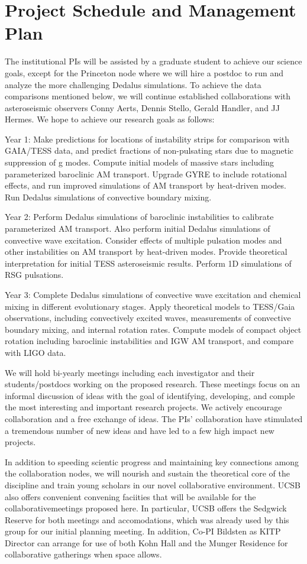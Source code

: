 \section{Project Schedule and Management Plan}

The institutional PIs will be assisted by a graduate student to achieve our science goals, except for the Princeton node where we will hire a postdoc to run and analyze the more challenging Dedalus simulations. To achieve the data comparisons mentioned below, we will continue established collaborations with asteroseismic observers Conny Aerts, Dennis Stello, Gerald Handler, and JJ Hermes. We hope to achieve our research goals as follows:

Year 1: Make predictions for locations of instability strips for comparison with GAIA/TESS data, and predict fractions of non-pulsating stars due to magnetic suppression of g modes. Compute initial models of massive stars including parameterized baroclinic AM transport. Upgrade GYRE to include rotational effects, and run improved simulations of AM transport by heat-driven modes. Run Dedalus simulations of convective boundary mixing.

Year 2: Perform Dedalus simulations of baroclinic instabilities to calibrate parameterized AM transport. Also perform initial Dedalus simulations of convective wave excitation. Consider effects of multiple pulsation modes and other instabilities on AM transport by heat-driven modes. Provide theoretical interpretation for initial TESS asteroseismic results. Perform 1D simulations of RSG pulsations.

Year 3: Complete Dedalus simulations of convective wave excitation and chemical mixing in different evolutionary stages. Apply theoretical models to TESS/Gaia observations, including convectively excited waves, measurements of convective boundary mixing, and internal rotation rates. Compute models of compact object rotation including baroclinic instabilities and IGW AM transport, and compare with LIGO data.

We will hold bi-yearly meetings including each investigator and their students/postdocs working on the proposed research. These meetings focus on an informal discussion of ideas with the goal of identifying, developing, and comple the most interesting and important research projects. We actively encourage collaboration and a free exchange of ideas. The PIs' collaboration have stimulated a tremendous number of new ideas and have led to a few high impact new projects.

In addition to speeding scientic progress and maintaining
key connections among the collaboration nodes, we will nourish and sustain the theoretical
core of the discipline and train young scholars in our novel collaborative environment. UCSB also offers convenient convening faciities that will be available for the collaborativemeetings proposed here. In particular, UCSB offers the Sedgwick Reserve for both meetings and accomodations, which was already used by this group for our initial planning meeting. In addition,
Co-PI Bildsten as KITP Director can arrange for use of both Kohn Hall and the Munger Residence for
collaborative gatherings when space allows.

